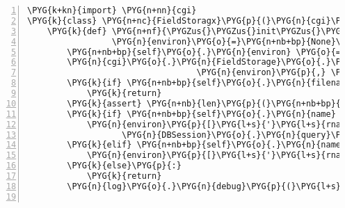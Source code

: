 \begin{Verbatim}[commandchars=\\\{\},numbers=left,firstnumber=1,stepnumber=5]
\PYG{k+kn}{import} \PYG{n+nn}{cgi}
\PYG{k}{class} \PYG{n+nc}{FieldStoragx}\PYG{p}{(}\PYG{n}{cgi}\PYG{o}{.}\PYG{n}{FieldStorage}\PYG{p}{)}\PYG{p}{:}
    \PYG{k}{def} \PYG{n+nf}{\PYGZus{}\PYGZus{}init\PYGZus{}\PYGZus{}}\PYG{p}{(}\PYG{n+nb+bp}{self}\PYG{p}{,} \PYG{n}{fp}\PYG{o}{=}\PYG{n+nb+bp}{None}\PYG{p}{,} \PYG{n}{headers}\PYG{o}{=}\PYG{n+nb+bp}{None}\PYG{p}{,} \PYG{n}{outerboundary}\PYG{o}{=}\PYG{l+s}{"}\PYG{l+s}{"}\PYG{p}{,}
                 \PYG{n}{environ}\PYG{o}{=}\PYG{n+nb+bp}{None}\PYG{p}{,} \PYG{n}{keep\PYGZus{}blank\PYGZus{}values}\PYG{o}{=}\PYG{l+m+mi}{0}\PYG{p}{,} \PYG{n}{strict\PYGZus{}parsing}\PYG{o}{=}\PYG{l+m+mi}{0}\PYG{p}{)}\PYG{p}{:}
        \PYG{n+nb+bp}{self}\PYG{o}{.}\PYG{n}{environ} \PYG{o}{=} \PYG{n}{environ}
        \PYG{n}{cgi}\PYG{o}{.}\PYG{n}{FieldStorage}\PYG{o}{.}\PYG{n}{\PYGZus{}\PYGZus{}init\PYGZus{}\PYGZus{}}\PYG{p}{(}\PYG{n+nb+bp}{self}\PYG{p}{,} \PYG{n}{fp}\PYG{p}{,} \PYG{n}{headers}\PYG{p}{,} \PYG{n}{outerboundary}\PYG{p}{,}
                                  \PYG{n}{environ}\PYG{p}{,} \PYG{n}{keep\PYGZus{}blank\PYGZus{}values}\PYG{p}{,} \PYG{n}{strict\PYGZus{}parsing}\PYG{p}{)}
        \PYG{k}{if} \PYG{n+nb+bp}{self}\PYG{o}{.}\PYG{n}{filename}\PYG{p}{:}
            \PYG{k}{return}
        \PYG{k}{assert} \PYG{n+nb}{len}\PYG{p}{(}\PYG{n+nb+bp}{self}\PYG{o}{.}\PYG{n}{value}\PYG{p}{)} \PYG{o}{\textless{}} \PYG{l+m+mi}{1000}
        \PYG{k}{if} \PYG{n+nb+bp}{self}\PYG{o}{.}\PYG{n}{name} \PYG{o}{==} \PYG{l+s}{'}\PYG{l+s}{session}\PYG{l+s}{'}\PYG{p}{:}
            \PYG{n}{environ}\PYG{p}{[}\PYG{l+s}{'}\PYG{l+s}{rnaseqlyse.upload\PYGZus{}session}\PYG{l+s}{'}\PYG{p}{]} \PYG{o}{=} \PYGZbs{}
                   \PYG{n}{DBSession}\PYG{o}{.}\PYG{n}{query}\PYG{p}{(}\PYG{n}{UploadSession}\PYG{p}{)}\PYG{o}{.}\PYG{n}{get}\PYG{p}{(}\PYG{n+nb}{int}\PYG{p}{(}\PYG{n+nb+bp}{self}\PYG{o}{.}\PYG{n}{value}\PYG{p}{)}\PYG{p}{)}
        \PYG{k}{elif} \PYG{n+nb+bp}{self}\PYG{o}{.}\PYG{n}{name} \PYG{o+ow}{in} \PYG{p}{(}\PYG{l+s}{'}\PYG{l+s}{name}\PYG{l+s}{'}\PYG{p}{,} \PYG{l+s}{'}\PYG{l+s}{type}\PYG{l+s}{'}\PYG{p}{)}\PYG{p}{:}
            \PYG{n}{environ}\PYG{p}{[}\PYG{l+s}{'}\PYG{l+s}{rnaseqlyse.upload\PYGZus{}}\PYG{l+s}{'} \PYG{o}{+} \PYG{n+nb+bp}{self}\PYG{o}{.}\PYG{n}{name}\PYG{p}{]} \PYG{o}{=} \PYG{n+nb+bp}{self}\PYG{o}{.}\PYG{n}{value}
        \PYG{k}{else}\PYG{p}{:}
            \PYG{k}{return}
        \PYG{n}{log}\PYG{o}{.}\PYG{n}{debug}\PYG{p}{(}\PYG{l+s}{"}\PYG{l+s}{FieldStoragx(}\PYG{l+s+si}{\PYGZpc{}s}\PYG{l+s}{ -\textgreater{} }\PYG{l+s+si}{\PYGZpc{}s}\PYG{l+s}{)}\PYG{l+s}{"} \PYG{o}{\PYGZpc{}} \PYG{p}{(}\PYG{n+nb+bp}{self}\PYG{o}{.}\PYG{n}{name}\PYG{p}{,} \PYG{n+nb+bp}{self}\PYG{o}{.}\PYG{n}{value}\PYG{p}{)}\PYG{p}{)}


\end{Verbatim}
